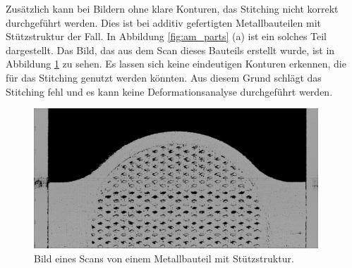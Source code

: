 Zusätzlich kann bei Bildern ohne klare Konturen, das Stitching nicht korrekt durchgeführt
werden. Dies ist bei additiv gefertigten Metallbauteilen mit Stützstruktur der Fall.
In Abbildung \ref{fig:am_parts} (a) ist ein solches Teil dargestellt. 
Das Bild, das aus dem Scan dieses Bauteils erstellt wurde, 
ist in Abbildung \ref{fig:errorimage} zu sehen. Es lassen sich keine eindeutigen Konturen 
erkennen, die für das Stitching genutzt werden könnten. Aus diesem Grund schlägt das Stitching 
fehl und es kann keine Deformationsanalyse durchgeführt werden.

\begin{figure}[H]
  \centering
  \includegraphics[width=0.95\textwidth]{images/am0.png}
  \caption{Bild eines Scans von einem Metallbauteil mit Stützstruktur.}
  \label{fig:errorimage}
\end{figure}


